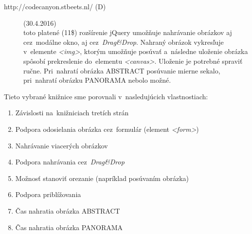 \begin{description}
	
	\item[http://codecanyon.stbeets.nl/ (D)](30.4.2016)\\
	toto platené (11\$) rozšírenie jQuery umožňuje nahrávanie obrázkov aj cez~modálne okno, aj cez~\emph{Drag\&Drop}. Nahraný obrázok vykresľuje v~elemente \emph{<img>}, ktorým umožňuje posúvať a~následne uloženie obrázka spôsobí prekreslenie do~elementu \emph{<canvas>}. Uloženie je potrebné spraviť ručne. Pri~nahratí obrázka ABSTRACT posúvanie mierne sekalo, pri~nahratí obrázku PANORAMA nebolo možné.

\end{description}

Tieto vybrané knižnice sme porovnali v~nasledujúcich vlastnostiach:
\begin{enumerate}
	\item Závislosti na~knižniciach tretích strán
	\item Podpora odosielania obrázka cez~formulár (element \emph{<form>})
	\item Nahrávanie viacerých obrázkov
	\item Podpora nahrávania cez~\emph{Drag&Drop}
	\item Možnosť stanoviť orezanie (napríklad posúvaním obrázka)
	\item Podpora priblížovania
	\item Čas nahratia obrázka ABSTRACT
	\item Čas nahratia obrázka PANORAMA 
\end{enumerate}

